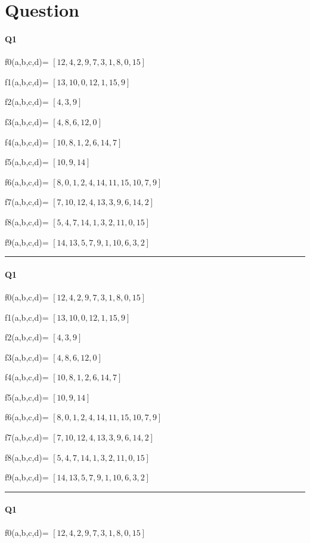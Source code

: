 
\section{Question}

\paragraph{Q1}


f0(a,b,c,d)= $[12, 4, 2, 9, 7, 3, 1, 8, 0, 15]$

f1(a,b,c,d)= $[13, 10, 0, 12, 1, 15, 9]$

f2(a,b,c,d)= $[4, 3, 9]$

f3(a,b,c,d)= $[4, 8, 6, 12, 0]$

f4(a,b,c,d)= $[10, 8, 1, 2, 6, 14, 7]$

f5(a,b,c,d)= $[10, 9, 14]$

f6(a,b,c,d)= $[8, 0, 1, 2, 4, 14, 11, 15, 10, 7, 9]$

f7(a,b,c,d)= $[7, 10, 12, 4, 13, 3, 9, 6, 14, 2]$

f8(a,b,c,d)= $[5, 4, 7, 14, 1, 3, 2, 11, 0, 15]$

f9(a,b,c,d)= $[14, 13, 5, 7, 9, 1, 10, 6, 3, 2]$


\hrule width 1\linewidth
\paragraph{Q1}


f0(a,b,c,d)= $[12, 4, 2, 9, 7, 3, 1, 8, 0, 15]$

f1(a,b,c,d)= $[13, 10, 0, 12, 1, 15, 9]$

f2(a,b,c,d)= $[4, 3, 9]$

f3(a,b,c,d)= $[4, 8, 6, 12, 0]$

f4(a,b,c,d)= $[10, 8, 1, 2, 6, 14, 7]$

f5(a,b,c,d)= $[10, 9, 14]$

f6(a,b,c,d)= $[8, 0, 1, 2, 4, 14, 11, 15, 10, 7, 9]$

f7(a,b,c,d)= $[7, 10, 12, 4, 13, 3, 9, 6, 14, 2]$

f8(a,b,c,d)= $[5, 4, 7, 14, 1, 3, 2, 11, 0, 15]$

f9(a,b,c,d)= $[14, 13, 5, 7, 9, 1, 10, 6, 3, 2]$


\hrule width 1\linewidth
\paragraph{Q1}


f0(a,b,c,d)= $[12, 4, 2, 9, 7, 3, 1, 8, 0, 15]$


